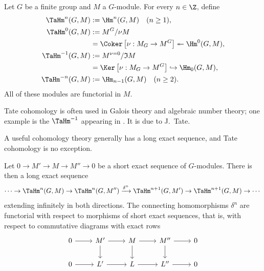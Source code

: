 \begin{definition}\label{def:TaHm}
	Let $G$ be a finite group and $M$ a $G$-module. For every $n \in \Z$,
	define
	\begin{align*}
		\TaHm^n(G, M) & := \Hm^n(G, M) \quad (n \geq 1), \\
		\TaHm^0(G, M) & := M^G / \nu M \\
		& = \Coker\left[ \nu: M_G \to M^G \right] \twoheadleftarrow \Hm^0(G, M), \\
		\TaHm^{-1}(G, M) & := M^{\nu=0} / \mathfrak{I} M \\
		& = \Ker\left[ \nu: M_G \to M^G \right] \hookrightarrow \Hm_0(G, M), \\
		\TaHm^{-n}(G, M) & := \Hm_{n-1}(G, M) \quad (n \geq 2).
	\end{align*}
	All of these modules are functorial in $M$.
\end{definition}

Tate cohomology is often used in Galois theory and algebraic number theory;
one example is the $\TaHm^{-1}$ appearing in
\cite[Definition 9.6.3]{Li1}. It is due to J.\ Tate.

A useful cohomology theory generally has a long exact sequence, and Tate
cohomology is no exception.

\begin{theorem}\label{prop:Tate-coh-long}
	Let $0 \to M' \to M \to M'' \to 0$ be a short exact sequence of
	$G$-modules. There is then a long exact sequence
	\[ \cdots \to \TaHm^n(G, M) \to \TaHm^n(G, M'') \xrightarrow{\delta^n} \TaHm^{n+1}(G, M') \to \TaHm^{n+1}(G, M) \to \cdots \]
	extending infinitely in both directions. The connecting homomorphisms
	$\delta^n$ are functorial with respect to morphisms of short exact
	sequences, that is, with respect to commutative diagrams with exact rows
	\[\begin{tikzcd}
		0 \arrow[r] & M' \arrow[d] \arrow[r] & M \arrow[d] \arrow[r] & M'' \arrow[d] \arrow[r] & 0 \\
		0 \arrow[r] & L' \arrow[r] & L \arrow[r] & L'' \arrow[r] & 0
	\end{tikzcd}\]
\end{theorem}

